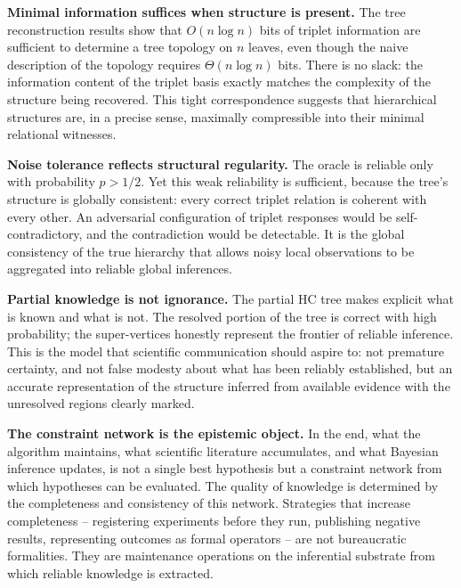 \medskip

\textbf{Minimal information suffices when structure is present.} The tree reconstruction results show that $O(n \log n)$ bits of triplet information are sufficient to determine a tree topology on $n$ leaves, even though the naive description of the topology requires $\Theta(n \log n)$ bits. There is no slack: the information content of the triplet basis exactly matches the complexity of the structure being recovered. This tight correspondence suggests that hierarchical structures are, in a precise sense, maximally compressible into their minimal relational witnesses.

\medskip

\textbf{Noise tolerance reflects structural regularity.} The oracle is reliable only with probability $p > 1/2$. Yet this weak reliability is sufficient, because the tree's structure is globally consistent: every correct triplet relation is coherent with every other. An adversarial configuration of triplet responses would be self-contradictory, and the contradiction would be detectable. It is the global consistency of the true hierarchy that allows noisy local observations to be aggregated into reliable global inferences.

\medskip

\textbf{Partial knowledge is not ignorance.} The partial HC tree makes explicit what is known and what is not. The resolved portion of the tree is correct with high probability; the super-vertices honestly represent the frontier of reliable inference. This is the model that scientific communication should aspire to: not premature certainty, and not false modesty about what has been reliably established, but an accurate representation of the structure inferred from available evidence with the unresolved regions clearly marked.

\medskip

\textbf{The constraint network is the epistemic object.} In the end, what the algorithm maintains, what scientific literature accumulates, and what Bayesian inference updates, is not a single best hypothesis but a constraint network from which hypotheses can be evaluated. The quality of knowledge is determined by the completeness and consistency of this network. Strategies that increase completeness -- registering experiments before they run, publishing negative results, representing outcomes as formal operators -- are not bureaucratic formalities. They are maintenance operations on the inferential substrate from which reliable knowledge is extracted.

